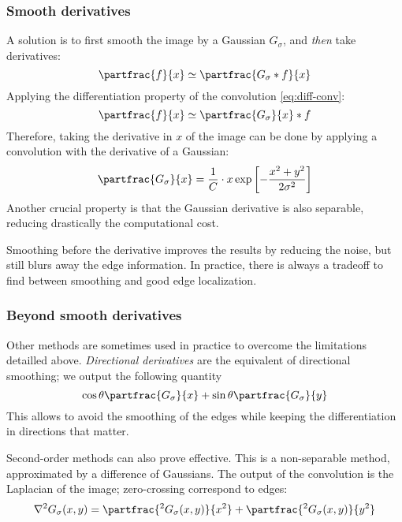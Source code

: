 \subsubsection{Smooth derivatives}
A solution is to first smooth the image by a Gaussian $G_\sigma$, and \emph{then} take derivatives:
\begin{equation*}
    \partfrac{f}{x} \simeq \partfrac{G_\sigma*f}{x}
\end{equation*}
Applying the differentiation property of the convolution \eqref{eq:diff-conv}:
\begin{equation*}
    \partfrac{f}{x} \simeq \partfrac{G_\sigma}{x}*f
\end{equation*}
Therefore, taking the derivative in $x$ of the image can be done by applying a convolution with the derivative of a Gaussian:
\begin{equation*}
    \partfrac{G_\sigma}{x}=\frac{1}{C}\cdot x\exp\left[-\frac{x^2+y^2}{2\sigma^2}\right]
\end{equation*}
Another crucial property is that the Gaussian derivative is also separable, reducing drastically the computational cost.


Smoothing before the derivative improves the results by reducing the noise, but still blurs away the edge information. In practice, there is always a tradeoff to find between smoothing and good edge localization.

\subsubsection{Beyond smooth derivatives}
Other methods are sometimes used in practice to overcome the limitations detailled above. \emph{Directional derivatives} are the equivalent of directional smoothing; we output the following quantity
\begin{equation*}
    \cos\theta\partfrac{G_\sigma}{x}+\sin\theta\partfrac{G_\sigma}{y}
\end{equation*}
This allows to avoid the smoothing of the edges while keeping the differentiation in directions that matter.

Second-order methods can also prove effective. This is a non-separable method, approximated by a difference of Gaussians. The output of the convolution is the Laplacian of the image; zero-crossing correspond to edges:
\begin{equation*}
    \nabla^2G_\sigma(x,y) = \partfrac{^2G_\sigma(x,y)}{x^2} + \partfrac{^2G_\sigma(x,y)}{y^2}
\end{equation*}